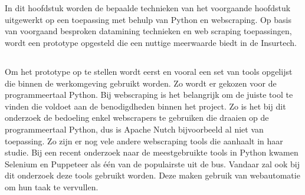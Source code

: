 
\chapter{}
\label{ch:prototype}

\section{}
\label{sec:inleiding}

In dit hoofdstuk worden de bepaalde technieken van het voorgaande hoofdstuk uitgewerkt op een toepassing met behulp van Python en webscraping. Op basis van voorgaand besproken datamining technieken en web scraping toepassingen, wordt een prototype opgesteld die een nuttige meerwaarde biedt in de Insurtech.

\section{}
\label{sec:Gebruikte tools}

Om het prototype op te stellen wordt eerst en vooral een set van tools opgelijst die binnen de werkomgeving gebruikt worden. Zo wordt er gekozen voor de programmeertaal Python.
Bij webscraping is het belangrijk om de juiste tool te vinden die voldoet aan de benodigdheden binnen het project. Zo is het bij dit onderzoek de bedoeling enkel webscrapers te gebruiken die draaien op de programmeertaal Python, dus is Apache Nutch bijvoorbeeld al niet van toepassing. Zo zijn er nog vele andere webscraping tools die \textcite{Sirisuriya2015} aanhaalt in haar studie. Bij een recent onderzoek naar de meestgebruikte tools in Python kwamen Selenium en Puppeteer als één van de populairste uit de bus. \autocite{Saurkar2018} Vandaar zal ook bij dit onderzoek deze tools gebruikt worden. Deze maken gebruik van webautomatie om hun taak te vervullen.
